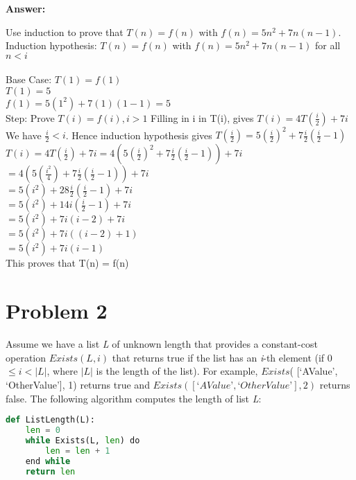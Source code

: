\documentclass{article}
\begin{document}
\noindent \textbf{Answer: }

\noindent
Use induction to prove that $T(n) = f(n) \text{ with } f(n) = 5n^2 + 7n(n-1)$.\\

\noindent
Induction hypothesis: $T(n) = f(n)$ with $f(n) = 5n^2 + 7n(n - 1)$ for all $n < i$\\\\
Base Case: $T(1) = f(1)$\\
$T(1) = 5$\\
$f(1) = 5(1^2) + 7(1)(1-1) = 5$\\

\noindent
Step: Prove $T(i) = f(i), i > 1$
Filling in i in T(i), gives $T(i) = 4T(\frac{i}{2}) + 7i$
We have $\frac{i}{2} < i$. Hence induction hypothesis gives $T(\frac{i}{2}) = 5(\frac{i}{2})^2+7\frac{i}{2}(\frac{i}{2}-1)$\\

\noindent
$T(i) = 4T(\frac{i}{2}) + 7i = 4(5(\frac{i}{2})^2+7\frac{i}{2}(\frac{i}{2}-1)) + 7i$\\
$= 4(5(\frac{i^2}{4})+7\frac{i}{2}(\frac{i}{2}-1)) + 7i$\\
$= 5(i^2)+28\frac{i}{2}(\frac{i}{2}-1) + 7i$\\
$= 5(i^2)+14i(\frac{i}{2}-1) + 7i$\\
$= 5(i^2)+7i(i-2) + 7i$\\
$= 5(i^2)+7i((i-2) + 1)$\\
$= 5(i^2)+7i(i-1)$\\

\noindent
This proves that T(n) = f(n)

\section*{Problem 2}
 Assume we have a list \textit{L} of unknown length that provides a constant-cost operation $Exists(L,i)$ that returns true if the list has an \textit{i}-th element (if 0 $\leq i < |L|$, where $|L|$ is the length of the list). For example, $Exists$( [‘AValue’, ‘OtherValue’], 1) returns true and $Exists( [‘AValue’, ‘OtherValue’], 2)$ returns false. The following algorithm computes the length of list \textit{L}:\\


\begin{lstlisting}[language=Python]
def ListLength(L):
    len = 0
    while Exists(L, len) do
        len = len + 1
    end while
    return len
\end{lstlisting}
\end{document}

